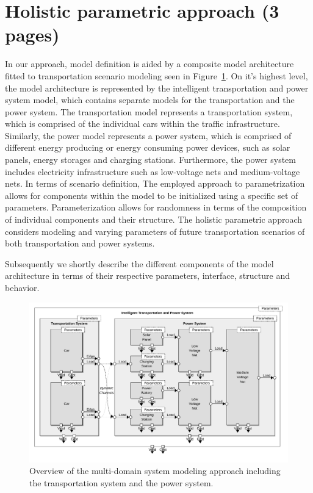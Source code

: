 \section{Holistic parametric approach (3 pages)}
\label{section:contribution_1}

In our approach, model definition is aided by a composite model architecture fitted to transportation scenario modeling seen in Figure~\ref{fig:model}. On it's highest level, the model architecture is represented by the intelligent transportation and power system model, which contains separate models for the transportation and the power system. The transportation model represents a transportation system, which is comprised of the individual cars within the traffic infrastructure. Similarly, the power model represents a power system, which is comprised of different energy producing or energy consuming power devices, such as solar panels, energy storages and charging stations. Furthermore, the power system includes electricity infrastructure such as low-voltage nets and medium-voltage nets. In terms of scenario definition, The employed approach to parametrization allows for components within the model to be initialized using a specific set of parameters. Parameterization allows for randomness in terms of the composition of individual components and their structure. The holistic parametric approach considers modeling and varying parameters of future transportation scenarios of both transportation and power systems.

Subsequently we shortly describe the different components of the model architecture in terms of their respective parameters, interface, structure and behavior. 

\begin{figure}[h]
	\centering
	\includegraphics[width=\textwidth]{../gfx/model2.pdf}
	\caption{Overview of the multi-domain system modeling approach including the transportation system and the power system.}
	\label{fig:model}
\end{figure}


